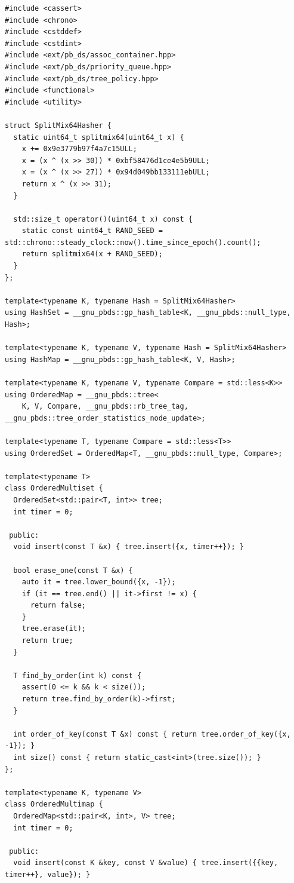 \begin{lstlisting}[style=cpp]
#include <cassert>
#include <chrono>
#include <cstddef>
#include <cstdint>
#include <ext/pb_ds/assoc_container.hpp>
#include <ext/pb_ds/priority_queue.hpp>
#include <ext/pb_ds/tree_policy.hpp>
#include <functional>
#include <utility>

struct SplitMix64Hasher {
  static uint64_t splitmix64(uint64_t x) {
    x += 0x9e3779b97f4a7c15ULL;
    x = (x ^ (x >> 30)) * 0xbf58476d1ce4e5b9ULL;
    x = (x ^ (x >> 27)) * 0x94d049bb133111ebULL;
    return x ^ (x >> 31);
  }

  std::size_t operator()(uint64_t x) const {
    static const uint64_t RAND_SEED = std::chrono::steady_clock::now().time_since_epoch().count();
    return splitmix64(x + RAND_SEED);
  }
};

template<typename K, typename Hash = SplitMix64Hasher>
using HashSet = __gnu_pbds::gp_hash_table<K, __gnu_pbds::null_type, Hash>;

template<typename K, typename V, typename Hash = SplitMix64Hasher>
using HashMap = __gnu_pbds::gp_hash_table<K, V, Hash>;

template<typename K, typename V, typename Compare = std::less<K>>
using OrderedMap = __gnu_pbds::tree<
    K, V, Compare, __gnu_pbds::rb_tree_tag, __gnu_pbds::tree_order_statistics_node_update>;

template<typename T, typename Compare = std::less<T>>
using OrderedSet = OrderedMap<T, __gnu_pbds::null_type, Compare>;

template<typename T>
class OrderedMultiset {
  OrderedSet<std::pair<T, int>> tree;
  int timer = 0;

 public:
  void insert(const T &x) { tree.insert({x, timer++}); }

  bool erase_one(const T &x) {
    auto it = tree.lower_bound({x, -1});
    if (it == tree.end() || it->first != x) {
      return false;
    }
    tree.erase(it);
    return true;
  }

  T find_by_order(int k) const {
    assert(0 <= k && k < size());
    return tree.find_by_order(k)->first;
  }

  int order_of_key(const T &x) const { return tree.order_of_key({x, -1}); }
  int size() const { return static_cast<int>(tree.size()); }
};

template<typename K, typename V>
class OrderedMultimap {
  OrderedMap<std::pair<K, int>, V> tree;
  int timer = 0;

 public:
  void insert(const K &key, const V &value) { tree.insert({{key, timer++}, value}); }


\end{lstlisting}
